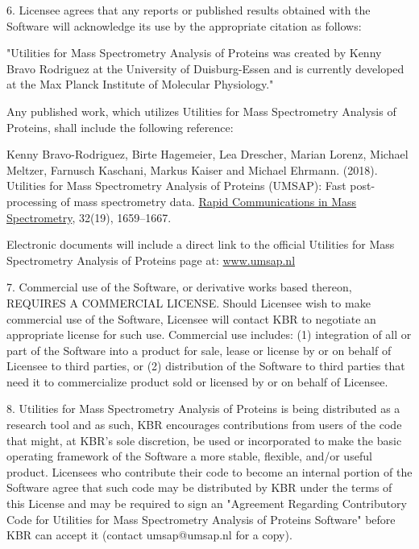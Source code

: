 \num{6}. Licensee agrees that any reports or published results obtained with the Software
will acknowledge its use by the appropriate citation as follows:

"Utilities for Mass Spectrometry Analysis of Proteins was created by Kenny Bravo
Rodriguez at the University of Duisburg-Essen and is currently developed at the
Max Planck Institute of Molecular Physiology."

Any published work, which utilizes Utilities for Mass Spectrometry Analysis of Proteins,
shall include the following reference:

Kenny Bravo-Rodriguez, Birte Hagemeier, Lea Drescher, Marian Lorenz, Michael Meltzer,
Farnusch Kaschani, Markus Kaiser and Michael Ehrmann. (\num{2018}). Utilities for
Mass Spectrometry Analysis of Proteins (UMSAP): Fast post-processing of mass spectrometry
data. \href{https://onlinelibrary.wiley.com/doi/10.1002/rcm.8243}{Rapid Communications
in Mass Spectrometry}, \num{32}(\num{19}), \numrange[range-phrase = --]{1659}{1667}.

Electronic documents will include a direct link to the official Utilities for Mass
Spectrometry Analysis of Proteins page at:
\href{https://www.umsap.nl/}{www.umsap.nl}

\num{7}. Commercial use of the Software, or derivative works based thereon, REQUIRES
A COMMERCIAL LICENSE.  Should Licensee wish to make commercial use of the Software,
Licensee will contact KBR to negotiate an appropriate license for such use. Commercial
use includes: 
(\num{1}) integration of all or part of the Software into a product for sale, lease
or license by or on behalf of Licensee to third parties, or 
(\num{2}) distribution of the Software to third parties that need it to commercialize
product sold or licensed by or on behalf of Licensee.

\num{8}. Utilities for Mass Spectrometry Analysis of Proteins is being distributed
as a research tool and as such, KBR encourages contributions from users of the code
that might, at KBR's sole discretion, be used or incorporated to make the basic
operating framework of the Software a more stable, flexible, and/or useful product.
Licensees who contribute their code to become an internal portion of the Software
agree that such code may be distributed by KBR under the terms of this License and
may be required to sign an "Agreement Regarding Contributory Code for Utilities for
Mass Spectrometry Analysis of Proteins Software" before KBR can accept it (contact
umsap@umsap.nl for a copy).

